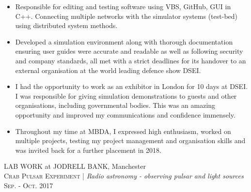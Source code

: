\documentclass[a4paper,10pt]{article}
\begin{document}
\begin{itemize}[leftmargin=*,topsep=0pt,noitemsep,parsep=0pt,partopsep=0pt,rightmargin=0.2cm]
\setlength\itemsep{0em}

 \item Responsible for editing and testing software using VBS, GitHub, GUI in C++. Connecting multiple networks with the simulator systems (test-bed) using distributed system methods.
  
 \item Developed a simulation environment along with thorough documentation ensuring user guides were accurate and readable as well as following security and company standards, all met with a strict deadlines for its handover to an external organisation at the world leading defence show DSEI.
 
 \item I had the opportunity to work as an exhibitor in London for 10 days at DSEI. I was responsible for giving simulation demonstrations to guests and other organisations, including governmental bodies. This was an amazing opportunity and improved my communications and confidence immensely.
 
 \item Throughout my time at MBDA, I expressed high enthusiasm, worked on multiple projects, testing my project management and organisation skills and was invited back for a further placement in 2018.
 
\end{itemize}

LAB WORK at JODRELL BANK, Manchester\\
\textsc{Crab Pulsar Experiment} | \small\emph{Radio astronomy - observing pulsar and light sources}\\
\textsc{ Sep. - Oct.} \textsc{2017}
\end{document}
